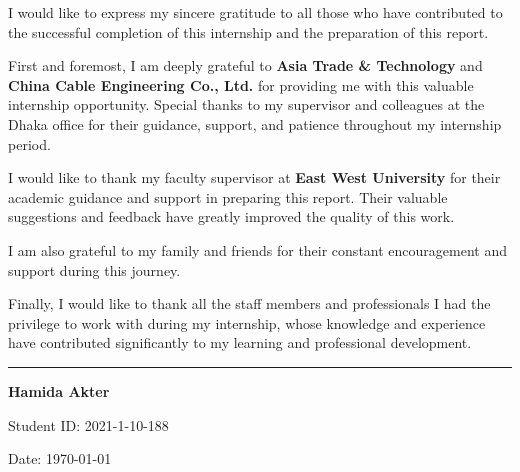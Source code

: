 \vspace{2cm}
\begin{minipage}{0.9\textwidth}
    \large
    I would like to express my sincere gratitude to all those who have contributed to the successful completion of this internship and the preparation of this report.
    
    \vspace{1cm}
    First and foremost, I am deeply grateful to \textbf{Asia Trade \& Technology} and \textbf{China Cable Engineering Co., Ltd.} for providing me with this valuable internship opportunity. Special thanks to my supervisor and colleagues at the Dhaka office for their guidance, support, and patience throughout my internship period.
    
    \vspace{1cm}
    I would like to thank my faculty supervisor at \textbf{East West University} for their academic guidance and support in preparing this report. Their valuable suggestions and feedback have greatly improved the quality of this work.
    
    \vspace{1cm}
    I am also grateful to my family and friends for their constant encouragement and support during this journey.
    
    \vspace{1cm}
    Finally, I would like to thank all the staff members and professionals I had the privilege to work with during my internship, whose knowledge and experience have contributed significantly to my learning and professional development.
    
    \vspace{2cm}
    \begin{minipage}{0.4\textwidth}
        \centering
        \rule{6cm}{0.5pt}
        
        \vspace{0.3cm}
        \textbf{Hamida Akter}
        
        \vspace{0.2cm}
        Student ID: 2021-1-10-188
        
        \vspace{0.2cm}
        Date: \today
    \end{minipage}
\end{minipage}
\par\endgroup

\newpage
\thispagestyle{empty}
\begingroup
\centering

